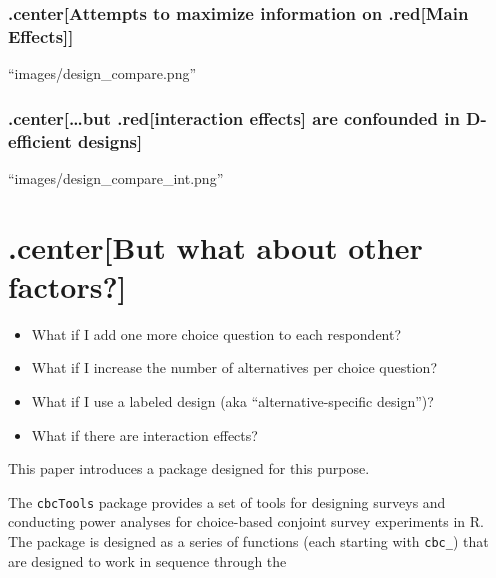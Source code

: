 \documentclass[
  12pt,
]{article}
\providecommand{\tightlist}{%
  \setlength{\itemsep}{0pt}\setlength{\parskip}{0pt}}
\begin{document}
\hypertarget{centerattempts-to-maximize-information-on-.redmain-effects}{%
\subsubsection{.center{[}Attempts to maximize information on .red{[}Main
Effects{]}{]}}\label{centerattempts-to-maximize-information-on-.redmain-effects}}

``images/design\_compare.png''

\hypertarget{centerbut-.redinteraction-effects-are-confounded-in-d-efficient-designs}{%
\subsubsection{.center{[}\ldots but .red{[}interaction effects{]} are
confounded in D-efficient
designs{]}}\label{centerbut-.redinteraction-effects-are-confounded-in-d-efficient-designs}}

``images/design\_compare\_int.png''

\hypertarget{centerbut-what-about-other-factors}{%
\section{.center{[}But what about other
factors?{]}}\label{centerbut-what-about-other-factors}}

\begin{itemize}
\tightlist
\item
  What if I add one more choice question to each respondent?
\item
  What if I increase the number of alternatives per choice question?
\item
  What if I use a labeled design (aka ``alternative-specific design'')?
\item
  What if there are interaction effects?
\end{itemize}

This paper introduces a package designed for this purpose.

The \texttt{cbcTools} package provides a set of tools for designing
surveys and conducting power analyses for choice-based conjoint survey
experiments in R. The package is designed as a series of functions (each
starting with \texttt{cbc\_}) that are designed to work in sequence
through the
\end{document}
